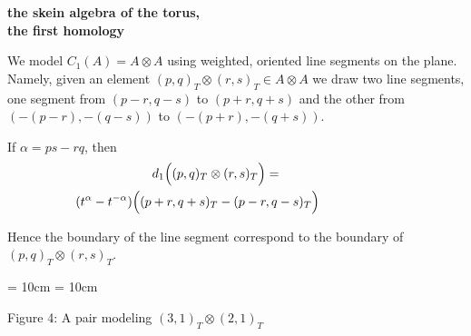 \documentclass{slides}
\theoremstyle{definition}
\begin{document}
\begin{slide}
\textbf{the skein algebra of the torus,\\ the first homology}

We model $C_1(A) = A \otimes A$ using
weighted, oriented line segments on the plane.
Namely, given an element $(p,q)_T \otimes (r,s)_T \in A \otimes A$
we draw two line segments, one segment from $(p-r,q-s)$ to
$(p+r,q+s)$ and the other from $(-(p-r),-(q-s))$ to
$(-(p+r),-(q+s))$.

If $\alpha = ps - rq$, then
\begin{eqnarray}
d_1 \Big( (p,q)_T \otimes (r,s)_T \Big) & = & \nonumber \\
& & \hspace{-6cm}(t^\alpha - t^{-\alpha}) \Big( (p+r,q+s)_T - (p-r,q-s)_T \Big) \nonumber
\end{eqnarray}

Hence the boundary of the line segment correspond to the
boundary of $(p,q)_T \otimes (r,s)_T$.

\end{slide}

\begin{slide}

  \begin{center}
    \epsfxsize = 10cm
    \epsfysize = 10cm

Figure 4:  A pair modeling $(3,1)_T \otimes (2,1)_T$
  \end{center}

\end{slide}




\end{document}
